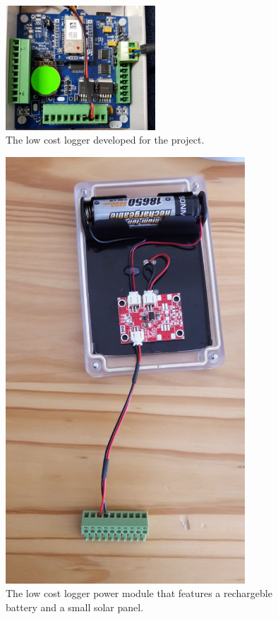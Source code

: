 \documentclass{wrcreport}
\begin{document}
\begin{figure}[!htp]
  \begin{center}
\includegraphics[width=0.5\textwidth]{esd-logger.jpg}
  \end{center}
  \caption[The low cost logger developed for the project.]{The low cost logger developed for the project.}
  \label{fig:logger}
\end{figure}

\begin{figure}[!htp]
  \begin{center}
\includegraphics[width=0.8\textwidth]{logger-power.jpg}
  \end{center}
  \caption[The low cost logger power module.]{The low cost logger power module that features a rechargeble battery and a small solar panel.}
  \label{fig:loggerpower}
\end{figure}
\end{document}
